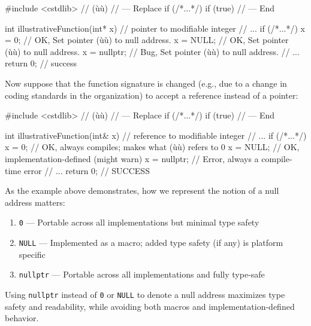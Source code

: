 \begin{emcppshiddenlisting}[emcppsbatch=e1]
#include <cstdlib>  // (ù{}ù)
// --- Replace
    if (/*...*/)
    if (true)
// --- End
\end{emcppshiddenlisting}
\begin{emcppslisting}[emcppsbatch=e1]
int illustrativeFunction(int* x)   // pointer to modifiable integer
{
    // ...
    if (/*...*/)
    {
        x = 0;       // OK, Set pointer (ù{}ù) to null address.
        x = NULL;    // OK, Set pointer (ù{}ù) to null address.
        x = nullptr; // Bug, Set pointer (ù{}ù) to null address.
    }
    // ...
    return 0;    // success
}
\end{emcppslisting}


Now suppose that the function signature is changed (e.g., due to a
change in coding standards in the organization) to accept a reference
instead of a pointer:

\begin{emcppshiddenlisting}[emcppsbatch=e2]
#include <cstdlib>  // (ù{}ù)
// --- Replace
    if (/*...*/)
    if (true)
// --- End
\end{emcppshiddenlisting}
\begin{emcppslisting}[emcppsbatch=e2]
int illustrativeFunction(int& x)  // reference to modifiable integer
{
    // ...
    if (/*...*/)
    {
        x = 0;       // OK, always compiles; makes what (ù{}ù) refers to 0
        x = NULL;    // OK, implementation-defined (might warn)
        x = nullptr; // Error, always a compile-time error
    }
    // ...
    return 0;    // SUCCESS
}
\end{emcppslisting}


As the example above demonstrates, how we represent the notion of a
null address matters:
\begin{enumerate}
\item{\lstinline!0! — Portable across all implementations but minimal type safety}
\item{\lstinline!NULL! — Implemented as a macro; added type safety (if any) is platform specific}
\item{\lstinline!nullptr! — Portable across all implementations and fully type-safe}
\end{enumerate}
Using \lstinline!nullptr! instead of \lstinline!0! or \lstinline!NULL! to denote
a null address maximizes type safety and readability, while avoiding
both macros and implementation-defined behavior.

